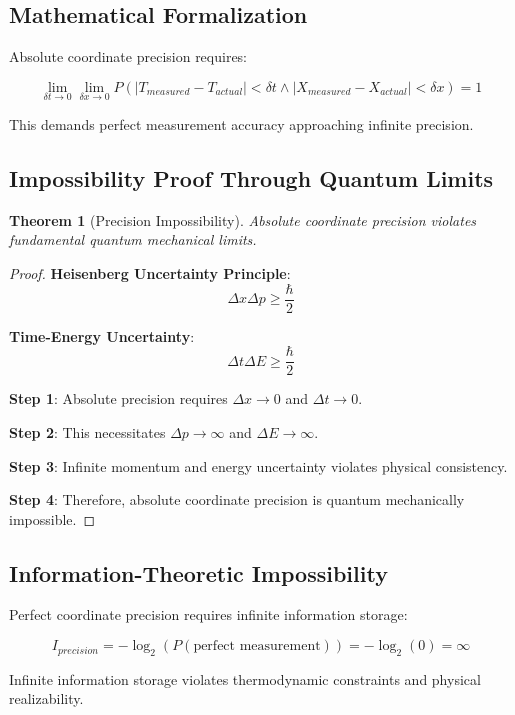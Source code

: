 \documentclass[12pt,a4paper]{article}
\newtheorem{theorem}{Theorem}[section]
\begin{document}
\subsection{Mathematical Formalization}

Absolute coordinate precision requires:

$$\lim_{\delta t \to 0} \lim_{\delta x \to 0} P(|T_{measured} - T_{actual}| < \delta t \land |X_{measured} - X_{actual}| < \delta x) = 1$$

This demands perfect measurement accuracy approaching infinite precision.

\subsection{Impossibility Proof Through Quantum Limits}

\begin{theorem}[Precision Impossibility]
Absolute coordinate precision violates fundamental quantum mechanical limits.
\end{theorem}

\begin{proof}
\textbf{Heisenberg Uncertainty Principle}:
$$\Delta x \Delta p \geq \frac{\hbar}{2}$$

\textbf{Time-Energy Uncertainty}:
$$\Delta t \Delta E \geq \frac{\hbar}{2}$$

\textbf{Step 1}: Absolute precision requires $\Delta x \to 0$ and $\Delta t \to 0$.

\textbf{Step 2}: This necessitates $\Delta p \to \infty$ and $\Delta E \to \infty$.

\textbf{Step 3}: Infinite momentum and energy uncertainty violates physical consistency.

\textbf{Step 4}: Therefore, absolute coordinate precision is quantum mechanically impossible.
\end{proof}

\subsection{Information-Theoretic Impossibility}

Perfect coordinate precision requires infinite information storage:

$$I_{precision} = -\log_2(P(\text{perfect measurement})) = -\log_2(0) = \infty$$

Infinite information storage violates thermodynamic constraints and physical realizability.
\end{document}
